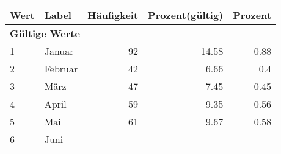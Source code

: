      \begin{longtable}{lXrrr}
     \toprule
     \textbf{Wert} & \textbf{Label} & \textbf{Häufigkeit} & \textbf{Prozent(gültig)} & \textbf{Prozent} \\
     \endhead
     \midrule
     \multicolumn{5}{l}{\textbf{Gültige Werte}}\\

     1 &
     \multicolumn{1}{X}{ Januar   } &


       \num{92} &
       \num[round-mode=places,round-precision=2]{14.58} &
         \num[round-mode=places,round-precision=2]{0.88} \\

     2 &
     \multicolumn{1}{X}{ Februar   } &


       \num{42} &
       \num[round-mode=places,round-precision=2]{6.66} &
         \num[round-mode=places,round-precision=2]{0.4} \\

     3 &
     \multicolumn{1}{X}{ März   } &


       \num{47} &
       \num[round-mode=places,round-precision=2]{7.45} &
         \num[round-mode=places,round-precision=2]{0.45} \\

     4 &
     \multicolumn{1}{X}{ April   } &


       \num{59} &
       \num[round-mode=places,round-precision=2]{9.35} &
         \num[round-mode=places,round-precision=2]{0.56} \\

     5 &
     \multicolumn{1}{X}{ Mai   } &


       \num{61} &
       \num[round-mode=places,round-precision=2]{9.67} &
         \num[round-mode=places,round-precision=2]{0.58} \\

     6 &
     \multicolumn{1}{X}{ Juni   } &



\end{longtable}

